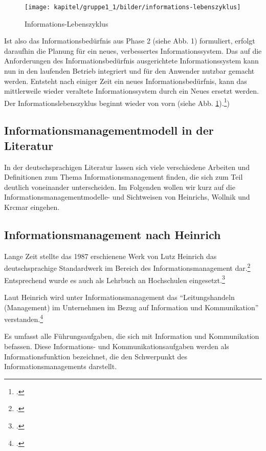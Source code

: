 \begin{figure}[h!]
	\centering
	\texttt{[image: kapitel/gruppe1\_1/bilder/informations-lebenszyklus]}
	\caption{Informations-Lebenszyklus}
	\label{fig_informations_lebenszyklus}
\end{figure}

Ist also das Informationsbedürfnis aus Phase 2 (siehe Abb. 1) formuliert, erfolgt daraufhin die Planung für ein neues, verbessertes Informationssystem. Das auf die Anforderungen des Informationsbedürfnis ausgerichtete Informationssystem kann nun in den laufenden Betrieb integriert und für den Anwender nutzbar gemacht werden. Entsteht nach einiger Zeit ein neues Informationsbedürfnis, kann das mittlerweile wieder veraltete Informationssystem durch ein Neues ersetzt werden. Der Informationslebenszyklus beginnt wieder von vorn (siehe Abb. \ref{fig_informations_lebenszyklus}).\footcite{dippold_datenmanagement_2005})

\subsection{Informationsmanagementmodell in der Literatur}
In der deutschsprachigen Literatur lassen sich viele verschiedene Arbeiten und Definitionen zum Thema Informationsmanagement finden, die sich zum Teil deutlich voneinander unterscheiden. Im Folgenden wollen wir kurz auf die Informationsmanagementmodelle- und Sichtweisen von Heinrichs, Wollnik und Krcmar eingehen.

\subsection{Informationsmanagement nach Heinrich}
Lange Zeit stellte das 1987 erschienene Werk von Lutz Heinrich das deutschsprachige Standardwerk im Bereich des Informationsmanagement dar.\footcite{heinrich_informationsmanagement_2005} Entsprechend wurde es auch als Lehrbuch an Hochschulen eingesetzt.\footcite[Vgl.][]{heinrich_inm_2002}

Laut Heinrich wird unter Informationsmanagement das “Leitungshandeln (Management) im Unternehmen im Bezug auf Information und Kommunikation” verstanden.\footcite{heinrich_informationsmanagement_2005}

Es umfasst alle Führungsaufgaben, die sich mit Information und Kommunikation befassen. Diese Informations- und Kommunikationsaufgaben werden als Informationsfunktion bezeichnet, die den Schwerpunkt des Informationsmanagements darstellt. 

